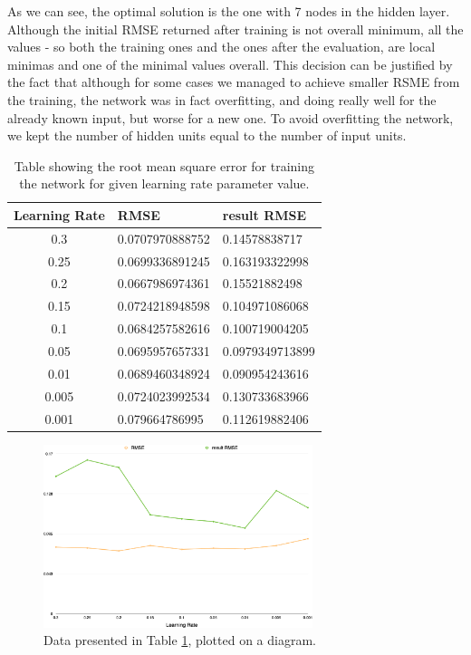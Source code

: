 As we can see, the optimal solution is the one with 7 nodes in the hidden layer. Although the initial RMSE returned after training is not overall minimum, all the values - so both the training ones and the ones after the evaluation, are local minimas and one of the minimal values overall. This decision can be justified by the fact that although for some cases we managed to achieve smaller RSME from the training, the network was in fact overfitting, and doing really well for the already known input, but worse for a new one.
To avoid overfitting the network, we kept the number of hidden units equal to the number of input units. 

\begin{table}
\begin{center}
\begin{tabular} {| c | l | l |} \hline
 Learning Rate & RMSE & result RMSE \\  \hline \hline
 0.3 & 0.0707970888752 & 0.14578838717 \\ \hline
 0.25 & 0.0699336891245 & 0.163193322998 \\ \hline
 0.2 &  0.0667986974361 & 0.15521882498 \\ \hline
 0.15 & 0.0724218948598 & 0.104971086068 \\ \hline
 0.1 & 0.0684257582616 & 0.100719004205 \\ \hline
 0.05 & 0.0695957657331 & 0.0979349713899 \\ \hline
 0.01 & 0.0689460348924 & 0.090954243616 \\ \hline
 0.005 & 0.0724023992534 & 0.130733683966 \\ \hline
 0.001 &  0.079664786995 & 0.112619882406 \\ \hline
\end{tabular}
\caption{Table showing the root mean square error for training the network for given learning rate parameter value.}
\label{table:learningrate}
\end{center}
\end{table}

\begin{figure}[h]
	\centering
   \includegraphics[width=0.7\textwidth]{Figures/learningrate}
\caption{Data presented in Table \ref{table:learningrate}, plotted on a diagram.}
\end{figure}



